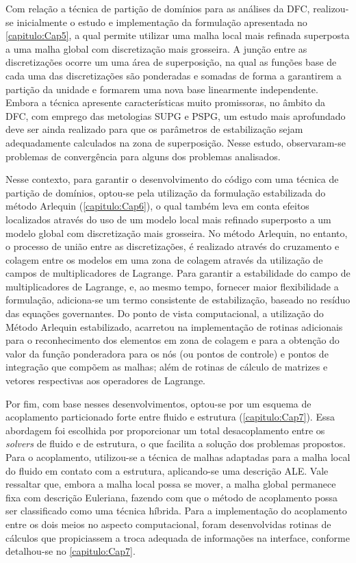 Com relação a técnica de partição de domínios para as análises da DFC, realizou-se inicialmente o estudo e implementação da formulação apresentada no \autoref{capitulo:Cap5}, a qual permite utilizar uma malha local mais refinada superposta a uma malha global com discretização mais grosseira. A junção entre as discretizações ocorre um uma área de superposição, na qual as funções base de cada uma das discretizações são ponderadas e somadas de forma a garantirem a partição da unidade e formarem uma nova base linearmente independente. Embora a técnica apresente características muito promissoras, no âmbito da DFC, com emprego das metologias SUPG e PSPG, um estudo mais aprofundado deve ser ainda realizado para que os parâmetros de estabilização sejam adequadamente calculados na zona de superposição. Nesse estudo, observaram-se problemas de convergência para alguns dos problemas analisados.

Nesse contexto, para garantir o desenvolvimento do código com uma técnica de partição de domínios, optou-se pela utilização da formulação estabilizada do método Arlequin (\autoref{capitulo:Cap6}), o qual também leva em conta efeitos localizados através do uso de um modelo local mais refinado superposto a um modelo global com discretização mais grosseira. No método Arlequin, no entanto, o processo de união entre as discretizações, é realizado através do cruzamento e colagem entre os modelos em uma zona de colagem através da utilização de campos de multiplicadores de Lagrange. Para garantir a estabilidade do campo de multiplicadores de Lagrange, e, ao mesmo tempo, fornecer maior flexibilidade a formulação, adiciona-se um termo consistente de estabilização, baseado no resíduo das equações governantes. Do ponto de vista computacional, a utilização do Método Arlequin estabilizado, acarretou na implementação de rotinas adicionais para o reconhecimento dos elementos em zona de colagem e para a obtenção do valor da função ponderadora para os nós (ou pontos de controle) e pontos de integração que compõem as malhas; além de rotinas de cálculo de matrizes e vetores respectivas aos operadores de Lagrange.

Por fim, com base nesses desenvolvimentos, optou-se por um esquema de acoplamento particionado forte entre fluido e estrutura (\autoref{capitulo:Cap7}). Essa abordagem foi escolhida por proporcionar um total desacoplamento entre os \textit{solvers} de fluido e de estrutura, o que facilita a solução dos problemas propostos. Para o acoplamento, utilizou-se a técnica de malhas adaptadas para a malha local do fluido em contato com a estrutura, aplicando-se uma descrição ALE. Vale ressaltar que, embora a malha local possa se mover, a malha global permanece fixa com descrição Euleriana, fazendo com que o método de acoplamento possa ser classificado como uma técnica híbrida. Para a implementação do acoplamento entre os dois meios no aspecto computacional, foram desenvolvidas rotinas de cálculos que propiciassem a troca adequada de informações na interface, conforme detalhou-se no \autoref{capitulo:Cap7}. 

